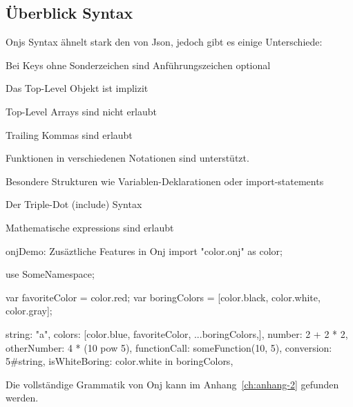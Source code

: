 
\subsection{Überblick Syntax}\label{subsec:ueberblick-syntax}

\renewcommand{\kapitelautor}{Autor: Marvin Kurka}

Onjs Syntax ähnelt stark den von Json, jedoch gibt es einige Unterschiede:
\begin{liste}
    \item Bei Keys ohne Sonderzeichen sind Anführungszeichen optional
    \item Das Top-Level Objekt ist implizit
    \item Top-Level Arrays sind nicht erlaubt
    \item Trailing Kommas sind erlaubt
    \item Funktionen in verschiedenen Notationen sind unterstützt.
    \item Besondere Strukturen wie Variablen-Deklarationen oder import-statements
    \item Der Triple-Dot (include) Syntax
    \item Mathematische expressions sind erlaubt
\end{liste}

\begin{codeBlock}{onj}{Demo: Zusäztliche Features in Onj}
import "color.onj" as color;

use SomeNamespace;

var favoriteColor = color.red;
var boringColors = [color.black, color.white, color.gray];

string: "a\nstring",
colors: [color.blue, favoriteColor, ...boringColors,],
number: 2 + 2 * 2,
otherNumber: 4 * (10 pow 5),
functionCall: someFunction(10, 5),
conversion: 5#string,
isWhiteBoring: color.white in boringColors,
\end{codeBlock}

\begin{infoBox}
Die vollständige Grammatik von Onj kann im Anhang~\ref{ch:anhang-2} gefunden werden.
\end{infoBox}

\renewcommand{\kapitelautor}{}
